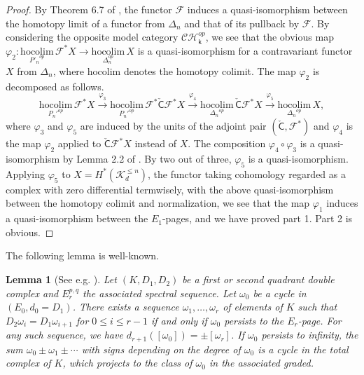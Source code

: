 \documentclass[reqno]{amsart}
\theoremstyle{definition}
\theoremstyle{plain}
\newtheorem{lem}[defi]{Lemma}
\newcommand{\CH}{\mathcal{CH}}%
\newcommand{\KK}{\mathcal{K}}%
\newcommand{\hocolim}{\mathrm{hocolim}}
\newcommand{\CECHF}{\check{\mathsf{C}}}
\newcommand{\kk}{\mathsf{k}}
\begin{document}
\begin{proof}
By Theorem 6.7 of \cite{sinha}, the functor $\mathcal{F}$  induces a quasi-isomorphism between the homotopy limit of a functor from $\Delta_n$ and that of its pullback by $\mathcal{F}$. By considering the opposite model category $\CH_\kk^{op}$, we see that the obvious map $ \varphi_2:\underset{{P'_n}^{op}}{\hocolim}\,\mathcal{F}^*X\to \underset{\Delta_n^{op}}{\hocolim}\, X$ is a quasi-isomorphism for a contravariant functor $X$ from $\Delta_n$, where $\hocolim$ denotes the homotopy colimit. 
The map $\varphi_2$ is decomposed as follows.
\[
\underset{{P_n'}^{op}}{\hocolim}\,\mathcal{F}^*X\stackrel{\varphi_3}{\longrightarrow} \underset{{P_n'}^{op}}{\hocolim}\,\mathcal{F}^*\CECHF\mathcal{F}^*X\stackrel{\varphi_4}{\longrightarrow} \underset{{\Delta_n}^{op}}{\hocolim}\,\CECHF\mathcal{F}^*X\stackrel{\varphi_5}{\longrightarrow} \underset{{\Delta_n}^{op}}{\hocolim}\,X,
\]
where $\varphi_3$ and $\varphi_5$ are induced by the units of the adjoint pair $(\CECHF, \mathcal{F}^*)$ and $\varphi_4$ is the map $\varphi_2$ applied to $\CECHF\mathcal{F}^*X$ instead of $X$. The composition $\varphi_4\circ\varphi_3$ is a quasi-isomorphism  by Lemma 2.2 of \cite{moriya1}. By two out of three, $\varphi_5$ is a quasi-isomorphism. Applying $\varphi_5$ to $X=H^*(\KK_d^{\leq n})$, the functor taking cohomology regarded as a complex with zero differential termwisely, with the above quasi-isomorphism between the homotopy colimit and normalization,  we see that the map $\varphi_1$ induces a quasi-isomorphism between the $E_1$-pages, and we have proved part 1. Part 2 is obvious.
\end{proof}
\indent The following lemma is well-known.
\begin{lem}[See e.g. \cite{BT}]\label{Lbasic_spec}
Let $(K,D_1,D_2)$ be a first or  second quadrant double complex and $E^{p,q}_r$ the associated spectral sequence. Let $\omega_0$ be a cycle in $(E_0,d_0=D_1)$.  There exists a sequence $\omega_1,\dots, \omega_r$ of  elements of $K$ such that $D_2\omega_i=D_1\omega_{i+1}$ for $0\leq i\leq r-1$ if and only if $\omega_0$ persists to the $E_r$-page. For any such  sequence, we have $d_{r+1}([\omega_0])=\pm [\omega_r]$. If $\omega_0$ persists to infinity, the sum $\omega_0\pm \omega_1\pm\cdots$ with signs depending on the degree of $\omega_0$ is a cycle in the total complex of $K$, which projects to the class of $\omega_0$ in the associated graded. \hfill \qedsymbol
\end{lem}
\end{document}
